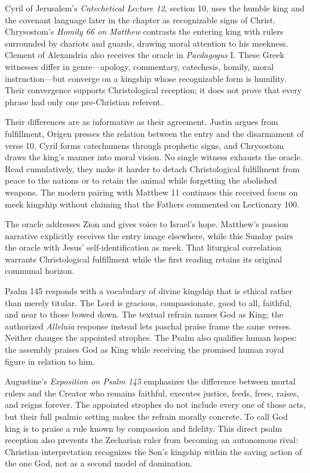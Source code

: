 \begin{deepstudy}
Cyril of Jerusalem's \emph{Catechetical Lecture 12}, section 10, uses the humble king and the covenant language later in the chapter as recognizable signs of Christ. Chrysostom's \emph{Homily 66 on Matthew} contrasts the entering king with rulers surrounded by chariots and guards, drawing moral attention to his meekness. Clement of Alexandria also receives the oracle in \emph{Paedagogus} I. These Greek witnesses differ in genre---apology, commentary, catechesis, homily, moral instruction---but converge on a kingship whose recognizable form is humility. Their convergence supports Christological reception; it does not prove that every phrase had only one pre-Christian referent.

Their differences are as informative as their agreement. Justin argues from fulfillment, Origen presses the relation between the entry and the disarmament of verse 10, Cyril forms catechumens through prophetic signs, and Chrysostom draws the king's manner into moral vision. No single witness exhausts the oracle. Read cumulatively, they make it harder to detach Christological fulfillment from peace to the nations or to retain the animal while forgetting the abolished weapons. The modern pairing with Matthew 11 continues this received focus on meek kingship without claiming that the Fathers commented on Lectionary 100.

The oracle addresses Zion and gives voice to Israel's hope. Matthew's passion narrative explicitly receives the entry image elsewhere, while this Sunday pairs the oracle with Jesus' self-identification as meek. That liturgical correlation warrants Christological fulfillment while the first reading retains its original communal horizon.

Psalm 145 responds with a vocabulary of divine kingship that is ethical rather than merely titular. The Lord is gracious, compassionate, good to all, faithful, and near to those bowed down. The textual refrain names God as King; the authorized \emph{Alleluia} response instead lets paschal praise frame the same verses. Neither changes the appointed strophes. The Psalm also qualifies human hopes: the assembly praises God as King while receiving the promised human royal figure in relation to him.

Augustine's \emph{Exposition on Psalm 145} emphasizes the difference between mortal rulers and the Creator who remains faithful, executes justice, feeds, frees, raises, and reigns forever. The appointed strophes do not include every one of those acts, but their full psalmic setting makes the refrain morally concrete. To call God king is to praise a rule known by compassion and fidelity. This direct psalm reception also prevents the Zecharian ruler from becoming an autonomous rival: Christian interpretation recognizes the Son's kingship within the saving action of the one God, not as a second model of domination.


\end{deepstudy}
